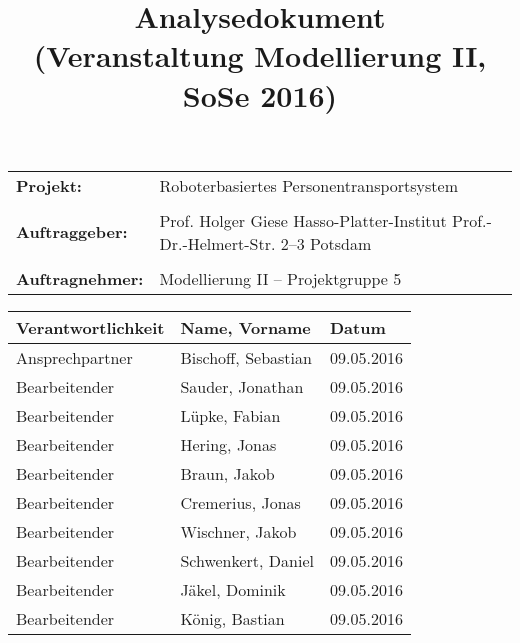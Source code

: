 \documentclass[includeheaders]{scrartcl}
\begin{document}
	

	\newpage

	\title{Analysedokument\\ \small{(Veranstaltung Modellierung II, SoSe 2016)}}
	\date{}
	\author{}

	\maketitle
	\begin{table}[H]
		\centering
		\begin{tabular}{@{}lp{7.5cm}@{}}
			\textbf{Projekt:} & Roboterbasiertes Personentransportsystem\\
			&\\
			\textbf{Auftraggeber: }& Prof. Holger Giese \newline Hasso-Platter-Institut \newline Prof.-Dr.-Helmert-Str. 2–3 \newline 14482 Potsdam\\
			&\\
			\textbf{Auftragnehmer: }& Modellierung II – Projektgruppe 5 \\
		\end{tabular}
	\end{table}



	\newpage

	\begin{table}[H]
		\centering
		\begin{tabularx}{\textwidth}{@{}p{4cm}Xp{4cm}@{}}
			\toprule
			Verantwortlichkeit & Name, Vorname & Datum \\
			\midrule
			Ansprechpartner    & Bischoff, Sebastian & 09.05.2016 \\
			Bearbeitender      & Sauder, Jonathan & 09.05.2016 \\
			Bearbeitender      & Lüpke, Fabian & 09.05.2016 \\
			Bearbeitender      & Hering, Jonas & 09.05.2016 \\
			Bearbeitender      & Braun, Jakob & 09.05.2016  \\
			Bearbeitender      & Cremerius, Jonas & 09.05.2016 \\
			Bearbeitender      & Wischner, Jakob & 09.05.2016 \\
			Bearbeitender      & Schwenkert, Daniel & 09.05.2016 \\
			Bearbeitender      & Jäkel, Dominik & 09.05.2016 \\
			Bearbeitender      & König, Bastian & 09.05.2016 \\
			\bottomrule
		\end{tabularx}
	\end{table}
\end{document}
